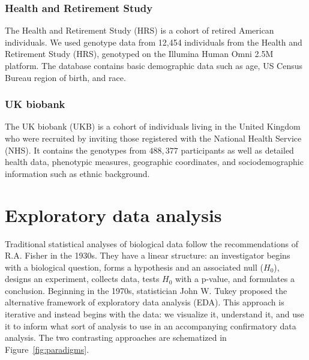 \subsubsection{Health and Retirement Study}

The Health and Retirement Study (HRS) is a cohort of retired American individuals\citep{juster_overview_1995}. We used genotype data from 12,454 individuals from the Health and Retirement Study (HRS), genotyped on the Illumina Human Omni 2.5M platform. The database contains basic demographic data such as age, US Census Bureau region of birth, and race.

\subsubsection{UK biobank}

The UK biobank (UKB) is a cohort of individuals living in the United Kingdom who were recruited by inviting those registered with the National Health Service (NHS)\citep{sudlow_uk_2015}. It contains the genotypes from $488,377$ participants as well as detailed health data, phenotypic measures, geographic coordinates, and sociodemographic information such as ethnic background.

\section{Exploratory data analysis}

Traditional statistical analyses of biological data follow the recommendations of R.A. Fisher in the 1930s\citep{holmes_modern_2019}. They have a linear structure: an investigator begins with a biological question, forms a hypothesis and an associated null ($H_0$), designs an experiment, collects data, tests $H_0$ with a p-value, and formulates a conclusion. Beginning in the 1970s, statistician John W. Tukey proposed the alternative framework of exploratory data analysis (EDA)\citep{tukey_1977,hoaglin_john_2003}. This approach is iterative and instead begins with the data: we visualize it, understand it, and use it to inform what sort of analysis to use in an accompanying confirmatory data analysis. The two contrasting approaches are schematized in Figure~\ref{fig:paradigms}.

